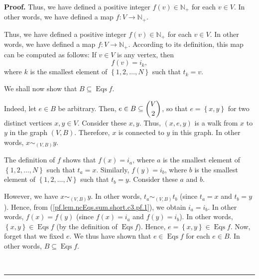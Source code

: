 \documentclass[numbers=enddot,12pt,final,onecolumn,notitlepage]{scrartcl}%
\theoremstyle{definition}
\newenvironment{proof}[1][Proof]{\noindent\textbf{#1.} }{\ \rule{0.5em}{0.5em}}
\newenvironment{verlong}{}{}
\newenvironment{vershort}{}{}
\begin{document}
\begin{proof}
\begin{vershort}
Thus, we have defined a positive integer $f\left(  v\right)  \in\mathbb{N}%
_{+}$ for each $v\in V$. In other words, we have defined a map $f:V\rightarrow
\mathbb{N}_{+}$.
\end{vershort}

\begin{verlong}
Thus, we have defined a positive integer $f\left(  v\right)  \in\mathbb{N}%
_{+}$ for each $v\in V$. In other words, we have defined a map $f:V\rightarrow
\mathbb{N}_{+}$. According to its definition, this map can be computed as
follows: If $v\in V$ is any vertex, then%
\begin{equation}
f\left(  v\right)  =i_{k}, \label{pf.lem.ncEqs.sum.c3.pf.fv=}%
\end{equation}
where $k$ is the smallest element of $\left\{  1,2,\ldots,N\right\}  $ such
that $t_{k}=v$.
\end{verlong}

We shall now show that $B\subseteq\operatorname*{Eqs}f$.

\begin{vershort}
Indeed, let $e\in B$ be arbitrary. Then, $e\in B\subseteq\dbinom{V}{2}$, so
that $e=\left\{  x,y\right\}  $ for two distinct vertices $x,y\in V$. Consider
these $x,y$. Thus, $\left(  x,e,y\right)  $ is a walk from $x$ to $y$ in the
graph $\left(  V,B\right)  $. Therefore, $x$ is connected to $y$ in this
graph. In other words, $x\sim_{\left(  V,B\right)  }y$.

The definition of $f$ shows that $f\left(  x\right)  =i_{a}$, where $a$ is the
smallest element of $\left\{  1,2,\ldots,N\right\}  $ such that $t_{a}=x$.
Similarly, $f\left(  y\right)  =i_{b}$, where $b$ is the smallest element of
$\left\{  1,2,\ldots,N\right\}  $ such that $t_{b}=y$. Consider these $a$ and
$b$.

However, we have $x\sim_{\left(  V,B\right)  }y$. In other words, $t_{a}%
\sim_{\left(  V,B\right)  }t_{b}$ (since $t_{a}=x$ and $t_{b}=y$). Hence, from
(\ref{pf.lem.ncEqs.sum.short.c3.pf.1}), we obtain $i_{a}=i_{b}$. In other
words, $f\left(  x\right)  =f\left(  y\right)  $ (since $f\left(  x\right)
=i_{a}$ and $f\left(  y\right)  =i_{b}$). In other words, $\left\{
x,y\right\}  \in\operatorname*{Eqs}f$ (by the definition of
$\operatorname*{Eqs}f$). Hence, $e=\left\{  x,y\right\}  \in
\operatorname*{Eqs}f$. Now, forget that we fixed $e$. We thus have shown that
$e\in\operatorname*{Eqs}f$ for each $e\in B$. In other words, $B\subseteq
\operatorname*{Eqs}f$.
\end{vershort}


\end{proof}
\end{document}
